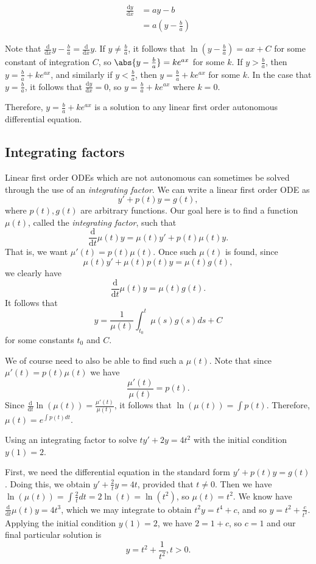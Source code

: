 \documentclass[12pt]{article}
\begin{document}
\begin{align*}
    \frac{\mathrm{d}y}{\mathrm{d}x} &= ay - b \\
    &= a(y - \frac{b}{a})
\end{align*}

Note that $\frac{\mathrm{d}}{\mathrm{d}x}{y - \frac{b}{a}} = \frac{\mathrm{d}}{\mathrm{d}x}y$. If $y \neq \frac{b}{a}$, it follows that $\ln(y - \frac{b}{a}) = ax + C$ for some constant of integration $C$, so $\abs{y - \frac{b}{a}} = ke^{ax}$ for some $k$. If $y > \frac{b}{a}$, then $y = \frac{b}{a} + ke^{ax}$, and similarly if $y < \frac{b}{a}$, then $y = \frac{b}{a} + ke^{ax}$ for some $k$. In the case that $y = \frac{b}{a}$, it follows that $\frac{\mathrm{d}y}{\mathrm{d}x} = 0$, so $y = \frac{b}{a} + ke^{ax}$ where $k = 0$.

Therefore, $y = \frac{b}{a} + ke^{ax}$ is a solution to any linear first order autonomous differential equation.

\subsection{Integrating factors}

Linear first order ODEs which are not autonomous can sometimes be solved through the use of an \emph{integrating factor}. We can write a linear first order ODE as \[y' + p(t)y = g(t),\] where $p(t), g(t)$ are arbitrary functions. Our goal here is to find a function $\mu(t)$, called the \emph{integrating factor}, such that
\[\frac{\mathrm{d}}{\mathrm{d}t}\mu(t)y = \mu(t)y' + p(t)\mu(t)y.\] That is, we want $\mu'(t) = p(t)\mu(t)$. Once such $\mu(t)$ is found, since \[\mu(t)y' + \mu(t)p(t)y = \mu(t)g(t),\] we clearly have \[\frac{\mathrm{d}}{\mathrm{d}t}\mu(t)y = \mu(t)g(t).\] It follows that \[y = \frac{1}{\mu(t)}\int_{t_0}^t \mu(s)g(s)ds + C\] for some constants $t_0$ and $C$.

We of course need to also be able to find such a $\mu(t)$. Note that since $\mu'(t) = p(t)\mu(t)$ we have \[\frac{\mu'(t)}{\mu(t)} = p(t).\] Since $\frac{\mathrm{d}}{\mathrm{d}t}\ln(\mu(t)) = \frac{\mu'(t)}{\mu(t)}$, it follows that $\ln(\mu(t)) = \int p(t)$. Therefore, $\mu(t) = e^{\int p(t)dt}$.

\begin{exmp}
    Using an integrating factor to solve $ty' + 2y = 4t^2$ with the initial condition $y(1) = 2$.

    First, we need the differential equation in the standard form $y' + p(t)y = g(t)$. Doing this, we obtain $y' + \frac{2}{t}y = 4t$, provided that $t \neq 0$. Then we have $\ln(\mu(t)) = \int \frac{2}{t}dt = 2\ln(t) = \ln(t^2)$, so $\mu(t) = t^2$. We know have $\frac{\mathrm{d}}{\mathrm{d}t}\mu(t)y = 4t^3$, which we may integrate to obtain $t^2y = t^4 + c$, and so $y = t^2 + \frac{c}{t^2}$. Applying the initial condition $y(1) = 2$, we have $2 = 1 + c$, so $c = 1$ and our final particular solution is \[y = t^2 + \frac{1}{t^2}, t > 0.\]
\end{exmp}
\end{document}
